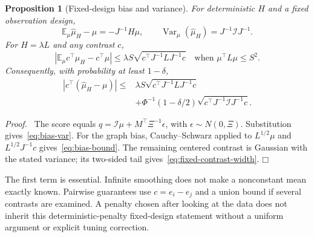 \documentclass[11pt]{article}
\newtheorem{proposition}[theorem]{Proposition}
\newenvironment{proof}{\par\noindent\textit{Proof.}\ }{\hfill$\mdlgwhtsquare$\par\medskip}
\newcommand{\E}{\mathbb E}
\newcommand{\Var}{\operatorname{Var}}
\begin{document}
\begin{proposition}[Fixed-design bias and variance]
For deterministic $H$ and a fixed observation design,
\begin{equation}
\E_\mu\widehat\mu_H-\mu=-J^{-1}H\mu,\qquad
\Var_\mu(\widehat\mu_H)=J^{-1}\mathcal I J^{-1}.
\label{eq:bias-var}
\end{equation}
For $H=\lambda L$ and any contrast $c$,
\begin{equation}
|\E_\mu c^\top\widehat\mu_H-c^\top\mu|
\le \lambda S\sqrt{c^\top J^{-1}LJ^{-1}c}
\quad\text{when }\mu^\top L\mu\le S^2.
\label{eq:bias-bound}
\end{equation}
Consequently, with probability at least $1-\delta$,
\begin{align}
|c^\top(\widehat\mu_H-\mu)|\le{}&
\lambda S\sqrt{c^\top J^{-1}LJ^{-1}c}\nonumber\\
&+\Phi^{-1}(1-\delta/2)
\sqrt{c^\top J^{-1}\mathcal I J^{-1}c}.
\label{eq:fixed-contrast-width}
\end{align}
\end{proposition}
\begin{proof}
The score equals $q=\mathcal I\mu+M^\top\Xi^{-1}\epsilon$, with $\epsilon\sim N(0,\Xi)$. Substitution gives~\eqref{eq:bias-var}. For the graph bias, Cauchy--Schwarz applied to $L^{1/2}\mu$ and $L^{1/2}J^{-1}c$ gives~\eqref{eq:bias-bound}. The remaining centered contrast is Gaussian with the stated variance; its two-sided tail gives~\eqref{eq:fixed-contrast-width}.
\end{proof}

The first term is essential. Infinite smoothing does not make a nonconstant mean exactly known. Pairwise guarantees use $c=e_i-e_j$ and a union bound if several contrasts are examined. A penalty chosen after looking at the data does not inherit this deterministic-penalty fixed-design statement without a uniform argument or explicit tuning correction.
\end{document}
